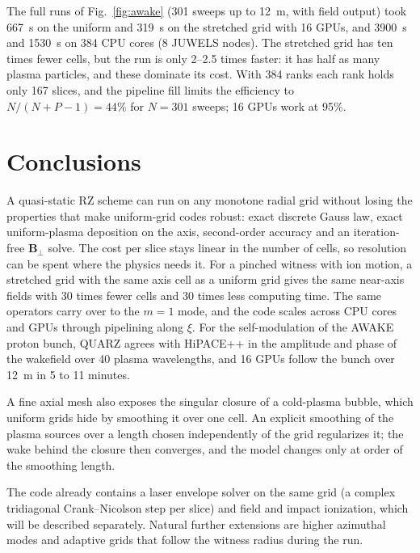 \documentclass[aps,prab,reprint,floatfix,superscriptaddress,amsmath,amssymb]{revtex4-2}
\begin{document}
The full runs of Fig.~\ref{fig:awake} (301 sweeps up to 12~m, with field output) took 667~s on the uniform and 319~s on the stretched grid with 16 GPUs, and 3900~s and 1530~s on 384 CPU cores (8 JUWELS nodes). The stretched grid has ten times fewer cells, but the run is only 2--2.5 times faster: it has half as many plasma particles, and these dominate its cost. With 384 ranks each rank holds only 167 slices, and the pipeline fill limits the efficiency to $N/(N+P-1) = 44\%$ for $N = 301$ sweeps; 16 GPUs work at 95\%.

\section{Conclusions}

A quasi-static RZ scheme can run on any monotone radial grid without losing the properties that make uniform-grid codes robust: exact discrete Gauss law, exact uniform-plasma deposition on the axis, second-order accuracy and an iteration-free $\bm{B}_\perp$ solve. The cost per slice stays linear in the number of cells, so resolution can be spent where the physics needs it. For a pinched witness with ion motion, a stretched grid with the same axis cell as a uniform grid gives the same near-axis fields with 30 times fewer cells and 30 times less computing time. The same operators carry over to the $m=1$ mode, and the code scales across CPU cores and GPUs through pipelining along $\xi$. For the self-modulation of the AWAKE proton bunch, QUARZ agrees with HiPACE++ in the amplitude and phase of the wakefield over 40 plasma wavelengths, and 16 GPUs follow the bunch over 12~m in 5 to 11 minutes.

A fine axial mesh also exposes the singular closure of a cold-plasma bubble, which uniform grids hide by smoothing it over one cell. An explicit smoothing of the plasma sources over a length chosen independently of the grid regularizes it; the wake behind the closure then converges, and the model changes only at order of the smoothing length.

The code already contains a laser envelope solver on the same grid (a complex tridiagonal Crank--Nicolson step per slice) and field and impact ionization, which will be described separately. Natural further extensions are higher azimuthal modes and adaptive grids that follow the witness radius during the run.
\end{document}
